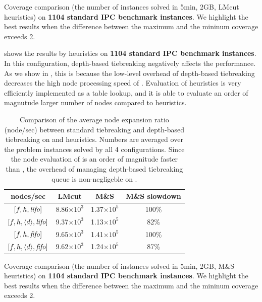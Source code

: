 \begin{table}[htbp]
 {
 \centering
 
 \caption{
 Coverage comparison (the number of instances solved in 5min, 2GB, LMcut
 heuristics) on \textbf{1104 standard IPC benchmark instances}. We highlight the
 best results when the difference between the maximum and the mininum coverage exceeds 2.
 }
 \label{tbl:lmcut-ipc-full}
 }
\end{table}


 shows the results by \mands heuristics on \textbf{1104 standard
IPC benchmark instances}.
In this configuration, depth-based tiebreaking negatively affects the performance.
As we show in , this is because
the low-level overhead of depth-based tiebreaking decreases the high
node processing speed of \mands. Evaluation of \mands heuristics is
very efficiently implemented as a table lookup, and it is able to
evaluate an order of magnutude larger number of nodes
compared to \lmcut heuristics.


\begin{table}[htb]
 \centering
 \begin{tabular}{cccc}
  nodes/sec                  & LMcut      & M\&S       & M\&S slowdown\\
  \hline
  $[f,h,{\text{\textit{lifo}}}]$              & 8.86$\times 10^3$ & 1.37$\times 10^5$ & 100\%\\
  $[f,h,{\left<d\right>},{\text{\textit{lifo}}}]$ & 9.37$\times 10^3$ & 1.13$\times 10^5$ & 82\%\\
  \hline
  $[f,h,{\text{\textit{fifo}}}]$              & 9.65$\times 10^3$ & 1.41$\times 10^5$ & 100\%\\
  $[f,h,{\left<d\right>},{\text{\textit{fifo}}}]$ & 9.62$\times 10^3$ & 1.24$\times 10^5$ & 87\%\\
  \hline
 \end{tabular}
 \caption{Comparison of the average node expansion ratio (node/sec) between
 standard tiebreaking and depth-based tiebreaking on \lmcut and \mands
 heuristics. Numbers are averaged over the problem instances solved by
 all 4 configurations. Since the node evaluation of \mands is an order of
 magnitude faster than \lmcut, the overhead of managing depth-based
 tiebreaking queue is non-negligeble on \mands.}
 \label{tbl:expansion-ratio}
\end{table}

\begin{table}[htbp]
 {
 \centering
 
 \caption{
 Coverage comparison (the number of instances solved in 5min, 2GB, M\&S
 heuristics) on \textbf{1104 standard IPC benchmark instances}. We highlight the
 best results when the difference between the maximum and the mininum coverage exceeds 2.
 }
 \label{tbl:mands-ipc-full}
 }
\end{table}

